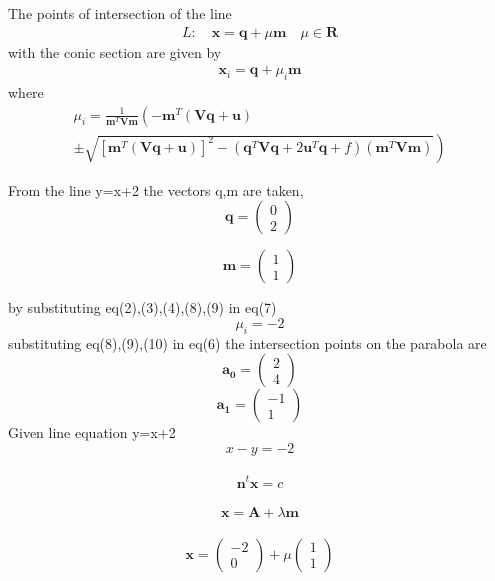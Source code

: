 \documentclass[journal,10pt,twocolumn]{article}
\let\vec\mathbf
\newcommand{\myvec}[1]{\ensuremath{\begin{pmatrix}#1\end{pmatrix}}}
\providecommand{\brak}[1]{\ensuremath{\left(#1\right)}}
\providecommand{\lbrak}[1]{\ensuremath{\left(#1\right.}}
\providecommand{\rbrak}[1]{\ensuremath{\left.#1\right)}}
\providecommand{\sbrak}[1]{\ensuremath{{}\left[#1\right]}}
\begin{document}
The points of intersection of the line 
\begin{align}
 L: \quad \vec{x} = \vec{q} + \mu \vec{m} \quad \mu \in \mathbf{R}
\label{eq:conic_tangent}
\end{align}
with the conic section are given by
\begin{align}
\vec{x}_i = \vec{q} + \mu_i \vec{m}
\label{eq:conic_tangent_pts}
\end{align}
%
where
{\tiny
\begin{multline}
\mu_i = \frac{1}
{
\vec{m}^T\vec{V}\vec{m}
}
\lbrak{-\vec{m}^T\brak{\vec{V}\vec{q}+\vec{u}}}
\\
\pm
\rbrak{\sqrt{
\sbrak{
\vec{m}^T\brak{\vec{V}\vec{q}+\vec{u}}
}^2
-
\brak
{
\vec{q}^T\vec{V}\vec{q} + 2\vec{u}^T\vec{q} +f
}
\brak{\vec{m}^T\vec{V}\vec{m}}
}
}
\label{eq:tangent_roots}
\end{multline}
}



From the line y=x+2 the vectors q,m are taken,
\begin{equation}
\vec{q}=\myvec{0\\2}
\end{equation}

\begin{equation}
\vec{m}=\myvec{1\\1}
\end{equation}

by substituting eq(2),(3),(4),(8),(9) in eq(7)
\begin{equation}
\mu_i=-2
\end{equation}
substituting eq(8),(9),(10) in eq(6) the intersection points on the parabola are
\begin{equation}
\vec{a_0}=\myvec{2\\4}
\end{equation}
\begin{equation}
\vec{a_1}=\myvec{-1\\1}
\end{equation}
Given line equation y=x+2\\

$$x-y=-2$$\\
$$\vec{n}^{t}\vec{x}=c$$\\
$$\vec{x}=\vec{A}+\lambda \vec{m}$$\\


$$\vec{x}=\begin{pmatrix}
-2\\ 
0
\end{pmatrix}+\mu \begin{pmatrix}
1\\ 
1
\end{pmatrix}$$\\
\end{document}
